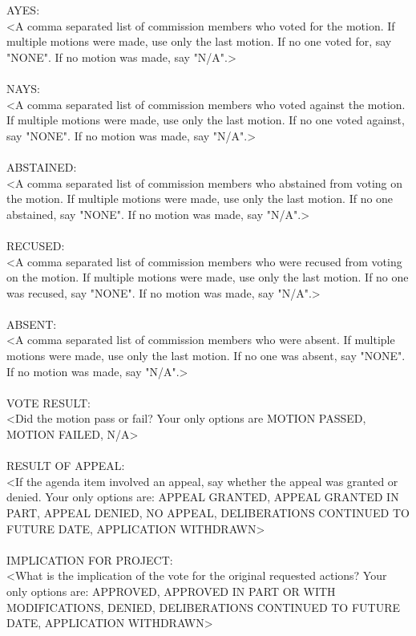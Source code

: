 AYES:\\ 
<A comma separated list of commission members who voted for the motion. If multiple motions were made, use only the last motion. If no one voted for, say "NONE". If no motion was made, say "N/A".>\\ 
\\ 
NAYS:\\ 
<A comma separated list of commission members who voted against the motion. If multiple motions were made, use only the last motion. If no one voted against, say "NONE". If no motion was made, say "N/A".>\\ 
\\ 
ABSTAINED:\\ 
<A comma separated list of commission members who abstained from voting on the motion. If multiple motions were made, use only the last motion. If no one abstained, say "NONE". If no motion was made, say "N/A".>\\ 
\\ 
RECUSED:\\ 
<A comma separated list of commission members who were recused from voting on the motion. If multiple motions were made, use only the last motion. If no one was recused, say "NONE". If no motion was made, say "N/A".>\\ 
\\ 
ABSENT:\\ 
<A comma separated list of commission members who were absent. If multiple motions were made, use only the last motion. If no one was absent, say "NONE". If no motion was made, say "N/A".>\\ 
\\ 
VOTE RESULT:\\ 
<Did the motion pass or fail? Your only options are MOTION PASSED, MOTION FAILED, N/A>\\ 
\\ 
RESULT OF APPEAL:\\ 
<If the agenda item involved an appeal, say whether the appeal was granted or denied. Your only options are: APPEAL GRANTED, APPEAL GRANTED IN PART, APPEAL DENIED, NO APPEAL, DELIBERATIONS CONTINUED TO FUTURE DATE, APPLICATION WITHDRAWN>\\ 
\\ 
IMPLICATION FOR PROJECT:\\ 
<What is the implication of the vote for the original requested actions? Your only options are: APPROVED, APPROVED IN PART OR WITH MODIFICATIONS, DENIED, DELIBERATIONS CONTINUED TO FUTURE DATE, APPLICATION WITHDRAWN>